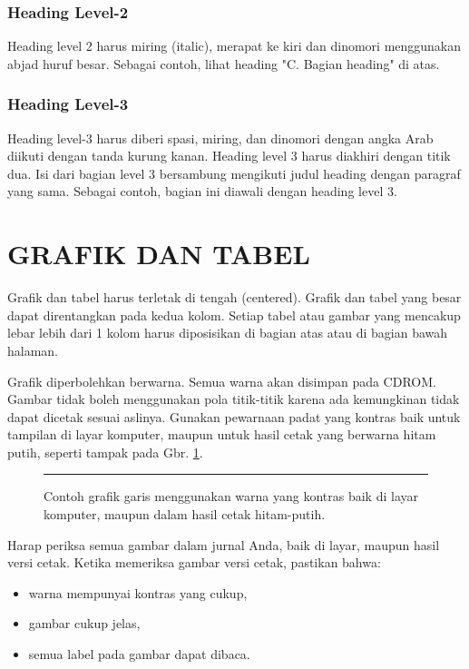 \documentclass[10pt,twocolumn]{article}
\begin{document}
\subsubsection{Heading Level-2} Heading level 2 harus miring (italic), merapat ke kiri dan dinomori menggunakan abjad huruf besar. Sebagai contoh, lihat heading "C. Bagian heading" di atas.

\subsubsection{Heading Level-3} Heading level-3 harus diberi spasi, miring, dan dinomori dengan angka Arab diikuti dengan tanda kurung kanan. Heading level 3 harus diakhiri dengan titik dua. Isi dari bagian level 3 bersambung mengikuti judul heading dengan paragraf yang sama. Sebagai contoh, bagian ini diawali dengan heading level 3.

\section{\MakeUppercase{Grafik dan Tabel}}
Grafik dan tabel harus terletak di tengah (centered). Grafik dan tabel yang besar dapat direntangkan pada kedua kolom. Setiap tabel atau gambar yang mencakup lebar lebih dari 1 kolom harus diposisikan di bagian atas atau di bagian bawah halaman.

Grafik diperbolehkan berwarna. Semua warna akan disimpan pada CDROM. Gambar tidak boleh menggunakan pola titik-titik karena ada kemungkinan tidak dapat dicetak sesuai aslinya. Gunakan pewarnaan padat yang kontras baik untuk tampilan di layar komputer, maupun untuk hasil cetak yang berwarna hitam putih, seperti tampak pada Gbr. \ref{fig:contoh_grafik}.

\begin{figure}[h]
\centering
\rule{\columnwidth}{3cm} %
\caption{\eightp Contoh grafik garis menggunakan warna yang kontras baik di layar komputer, maupun dalam hasil cetak hitam-putih.}
\label{fig:contoh_grafik}
\end{figure}

Harap periksa semua gambar dalam jurnal Anda, baik di layar, maupun hasil versi cetak. Ketika memeriksa gambar versi cetak, pastikan bahwa:
\begin{itemize}
\item warna mempunyai kontras yang cukup,
\item gambar cukup jelas,
\item semua label pada gambar dapat dibaca.
\end{itemize}
\end{document}
